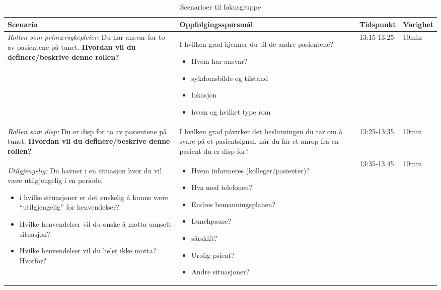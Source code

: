 \begin{table}[H]
\small
\begin{tabular}{p{4cm}|p{5cm}|l|l}
\hline
\textbf{Scenario} & \textbf{Oppfølgingsspørsmål} & \textbf{Tidspunkt} & \textbf{Varighet}\\
\hline
\emph{Rollen som primærsykepleier:} Du har ansvar for to av pasientene på tunet. \textbf{Hvordan vil du definere/beskrive denne rollen?} & I hvilken grad kjenner du til de andre pasientene? \begin{itemize}
\item Hvem har ansvar?
\item sykdomsbilde og tilstand
\item lokasjon
\item hvem og hvilket type rom
\end{itemize}
& 13:15-13:25 & 10min\\
\hline
\emph{Rollen som disp:} Du er disp for to av pasientene på tunet. \textbf{Hvordan vil du definere/beskrive denne rollen?} & I hvilken grad påvirker det beslutningen du tar om å svare på et pasientsignal, når du får et anrop fra en pasient du er disp for?
 & 13:25-13:35 & 10min\\
\hline
\emph{Utilgjengelig:} Du havner i en situasjon hvor du vil være utilgjengelig i en periode.
\begin{itemize}
\item i hvilke situasjoner er det ønskelig å kunne være “utilgjengelig” for henvendelser?
\item Hvilke henvendelser vil du ønske å motta uansett situasjon?
\item Hvilke henvendelser vil du helst ikke motta? Hvorfor?
\end{itemize}
& 
\begin{itemize}
\item Hvem informeres (kolleger/pasienter)?
\item Hva med telefonen?
\item Endres bemanningsplanen?
\item Lunchpause?
\item sårskift?
\item Urolig psient?
\item Andre situasjoner?
\end{itemize}
& 13:35-13.45 & 10min\\
\end{tabular}
\caption{Scenarioer til fokusgruppe}
\label{Steg2}
\end{table}


